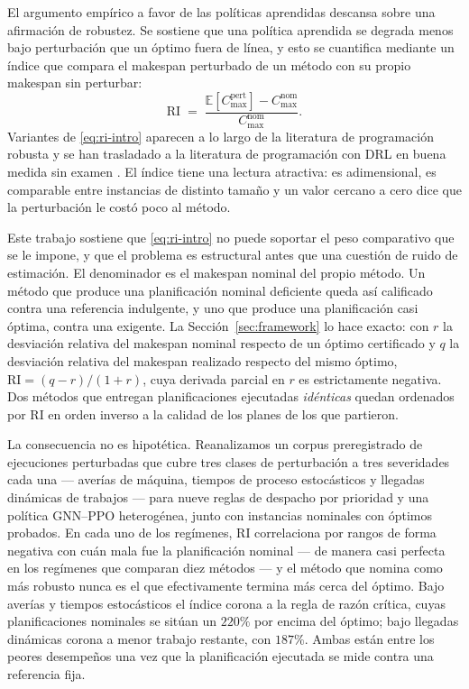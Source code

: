\documentclass[a4paper,fleqn]{cas-sc}
\newcommand{\Cmax}{C_{\max}}
\newcommand{\RI}{\mathrm{RI}}
\begin{document}
El argumento empírico a favor de las políticas aprendidas descansa sobre una
afirmación de robustez. Se sostiene que una política aprendida se degrada menos
bajo perturbación que un óptimo fuera de línea, y esto se cuantifica mediante un
índice que compara el makespan perturbado de un método con su propio makespan
sin perturbar:
\begin{equation}\label{eq:ri-intro}
  \RI \;=\; \frac{\mathbb{E}\!\left[\Cmax^{\text{pert}}\right]-\Cmax^{\text{nom}}}
                 {\Cmax^{\text{nom}}}.
\end{equation}
Variantes de \eqref{eq:ri-intro} aparecen a lo largo de la literatura de
programación robusta \citep{leon1994,mehta1998,goren2008,sabuncuoglu2000} y se
han trasladado a la literatura de programación con DRL en buena medida sin
examen \citep{smit2025,huang2025,xu2024survey}. El índice tiene una lectura
atractiva: es adimensional, es comparable entre instancias de distinto tamaño y
un valor cercano a cero dice que la perturbación le costó poco al método.

Este trabajo sostiene que \eqref{eq:ri-intro} no puede soportar el peso
comparativo que se le impone, y que el problema es estructural antes que una
cuestión de ruido de estimación. El denominador es el makespan nominal del
propio método. Un método que produce una planificación nominal deficiente queda
así calificado contra una referencia indulgente, y uno que produce una
planificación casi óptima, contra una exigente. La
Sección~\ref{sec:framework} lo hace exacto: con $r$ la desviación relativa del
makespan nominal respecto de un óptimo certificado y $q$ la desviación relativa
del makespan realizado respecto del mismo óptimo, $\RI=(q-r)/(1+r)$, cuya
derivada parcial en $r$ es estrictamente negativa. Dos métodos que entregan
planificaciones ejecutadas \emph{idénticas} quedan ordenados por $\RI$ en orden
inverso a la calidad de los planes de los que partieron.

La consecuencia no es hipotética. Reanalizamos un corpus preregistrado de
\NRunsDisrupted{} ejecuciones perturbadas que cubre tres clases de perturbación
a tres severidades cada una --- averías de máquina, tiempos de proceso
estocásticos y llegadas dinámicas de trabajos --- para nueve reglas de despacho
por prioridad y una política GNN--PPO heterogénea, junto con \NInstances{}
instancias nominales con óptimos probados. En cada uno de los \NRegimes{}
regímenes, $\RI$ correlaciona por rangos de forma negativa con cuán mala fue la
planificación nominal --- de manera casi perfecta en los \NConfRegimes{}
regímenes que comparan diez métodos --- y el método que nomina como más robusto
nunca es el que efectivamente termina más cerca del óptimo. Bajo averías y tiempos
estocásticos el índice corona a la regla de razón crítica, cuyas planificaciones
nominales se sitúan un $220\%$ por encima del óptimo; bajo llegadas dinámicas
corona a menor trabajo restante, con $187\%$. Ambas están entre los peores
desempeños una vez que la planificación ejecutada se mide contra una referencia
fija.
\end{document}
